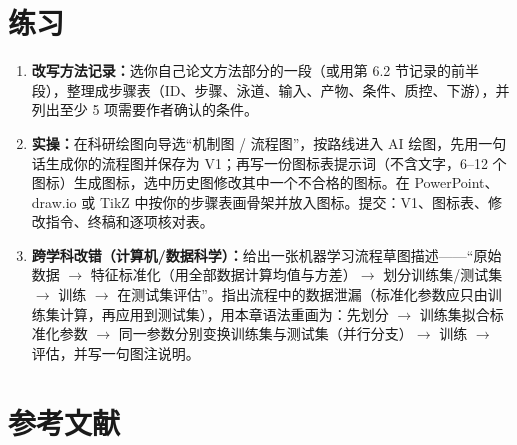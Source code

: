 \section{练习}

\begin{enumerate}
\item \textbf{改写方法记录：}选你自己论文方法部分的一段（或用第 6.2 节记录的前半段），整理成步骤表（ID、步骤、泳道、输入、产物、条件、质控、下游），并列出至少 5 项需要作者确认的条件。
\item \textbf{\scidraw{} 实操：}在科研绘图向导选“机制图 / 流程图”，按路线进入 AI 绘图，先用一句话生成你的流程图并保存为 V1；再写一份图标表提示词（不含文字，6–12 个图标）生成图标，选中历史图修改其中一个不合格的图标。在 PowerPoint、draw.io 或 TikZ 中按你的步骤表画骨架并放入图标。提交：V1、图标表、修改指令、终稿和逐项核对表。
\item \textbf{跨学科改错（计算机/数据科学）：}给出一张机器学习流程草图描述——“原始数据 $\rightarrow$ 特征标准化（用全部数据计算均值与方差）$\rightarrow$ 划分训练集/测试集 $\rightarrow$ 训练 $\rightarrow$ 在测试集评估”。指出流程中的数据泄漏（标准化参数应只由训练集计算，再应用到测试集），用本章语法重画为：先划分 $\rightarrow$ 训练集拟合标准化参数 $\rightarrow$ 同一参数分别变换训练集与测试集（并行分支）$\rightarrow$ 训练 $\rightarrow$ 评估，并写一句图注说明。
\end{enumerate}

\section*{参考文献}

